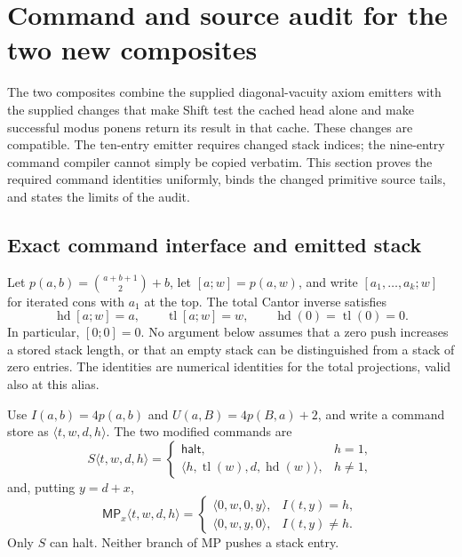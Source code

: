 \section{Command and source audit for the two new composites}
\label{sec:composite-command-audit}

The two composites combine the supplied diagonal-vacuity axiom emitters
with the supplied changes that make Shift test the cached head alone and
make successful modus ponens return its result in that cache. These changes
are compatible. The ten-entry emitter requires changed stack indices;
the nine-entry command compiler cannot simply be copied verbatim.
This section proves the required command identities uniformly, binds the
changed primitive source tails, and states the limits of the audit.

\subsection{Exact command interface and emitted stack}

Let $p(a,b)=\binom{a+b+1}{2}+b$, let $[a;w]=p(a,w)$, and write
$[a_1,\ldots,a_k;w]$ for iterated cons with $a_1$ at the top.
The total Cantor inverse satisfies
\[
 \operatorname{hd}[a;w]=a,\qquad
 \operatorname{tl}[a;w]=w,
 \qquad \operatorname{hd}(0)=\operatorname{tl}(0)=0.
\]
In particular, $[0;0]=0$. No argument below assumes that a zero push
increases a stored stack length, or that an empty stack can be distinguished
from a stack of zero entries. The identities are numerical identities for
the total projections, valid also at this alias.

Use $I(a,b)=4p(a,b)$ and $U(a,B)=4p(B,a)+2$, and write a command store
as $\langle t,w,d,h\rangle$. The two modified commands are
\[
 S\langle t,w,d,h\rangle=
 \begin{cases}
  \mathsf{halt},&h=1,\\
  \langle h,\operatorname{tl}(w),d,\operatorname{hd}(w)\rangle,&h\ne1,
 \end{cases}
\]
and, putting $y=d+x$,
\[
 \mathsf{MP}_x\langle t,w,d,h\rangle=
 \begin{cases}
  \langle0,w,0,y\rangle,&I(t,y)=h,\\
  \langle0,w,y,0\rangle,&I(t,y)\ne h.
 \end{cases}
\]
Only $S$ can halt. Neither branch of MP pushes a stack entry.

